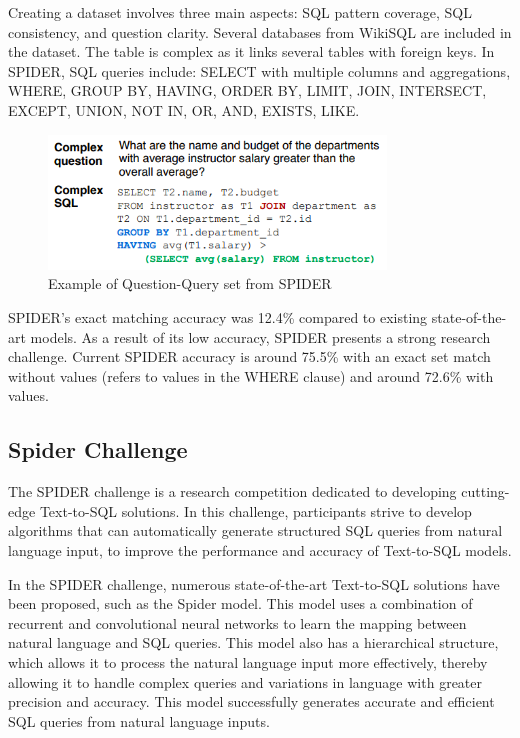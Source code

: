 Creating a dataset involves three main aspects: SQL pattern coverage, SQL consistency, and question clarity. Several databases from WikiSQL are included in the dataset. The table is complex as it links several tables with foreign keys. In SPIDER, SQL queries include: SELECT with multiple columns and aggregations, WHERE, GROUP BY, HAVING, ORDER BY, LIMIT, JOIN, INTERSECT, EXCEPT, UNION, NOT IN, OR, AND, EXISTS, LIKE.

\begin{figure}[htb]
    \centering
    \includegraphics[width=0.8\textwidth]{pics/db/Spider2.png}
    \caption{Example of Question-Query set from SPIDER\cite{yu_spider_2019}}
    \label{fig:Spider2}
\end{figure}

SPIDER's exact matching accuracy was 12.4\% compared to existing state-of-the-art models. As a result of its low accuracy, SPIDER presents a strong research challenge. Current SPIDER accuracy is around 75.5\% with an exact set match without values (refers to values in the WHERE clause) and around 72.6\% with values.

\subsection{Spider Challenge}

The SPIDER challenge is a research competition dedicated to developing cutting-edge Text-to-SQL solutions. In this challenge, participants strive to develop algorithms that can automatically generate structured SQL queries from natural language input, to improve the performance and accuracy of Text-to-SQL models.

In the SPIDER challenge, numerous state-of-the-art Text-to-SQL solutions have been proposed, such as the Spider model. This model uses a combination of recurrent and convolutional neural networks to learn the mapping between natural language and SQL queries. This model also has a hierarchical structure, which allows it to process the natural language input more effectively, thereby allowing it to handle complex queries and variations in language with greater precision and accuracy. This model successfully generates accurate and efficient SQL queries from natural language inputs.

